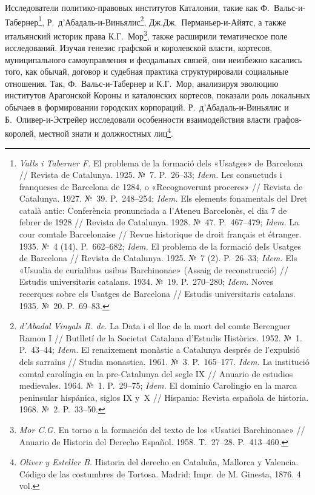 Исследователи политико-правовых институтов Каталонии, такие как Ф.~Вальс-и-Табернер\footnote{\emph{Valls i Taberner F.} El problema de la formació dels «Usatges» de Barcelona // Revista de Catalunya. 1925. №~7. P.~26--33; \emph{Idem.} Les consuetuds i franqueses de Barcelona de 1284, o «Recognoverunt proceres» // Revista de Catalunya. 1927. №~39. P.~248--254; \emph{Idem.} Els elements fonamentals del Dret català antic: Conferència pronunciada a l’Ateneu Barcelonès, el dia 7 de febrer de 1928 // Revista de Catalunya. 1928. №~47. P.~467--479; \emph{Idem.} La cour comtale Barcelonaise // Revue historique de droit français et étranger. 1935. №~4 (14). P.~662--682; \emph{Idem.} El problema de la formació deIs Usatges de Barcelona // Revista de Catalunya. 1925. №~7 (2). P.~26--33; \emph{Idem.} Els «Usualia de curialibus usibus Barchinonae» (Assaig de reconstrucció) // Estudis universitaris catalans. 1934. №~19. P.~270--280; \emph{Idem.} Noves recerques sobre els Usatges de Barcelona // Estudis universitaris catalans. 1935. №~20. P.~69--83.}, Р.~д’Абадаль-и-Виньялис\footnote{\emph{d’Abadal Vinyals R. de.} La Data i el lloc de la mort del comte Berenguer Ramon I // Butlletí de la Societat Catalana d’Estudis Històrics. 1952. №~1. P.~43--44; \emph{Idem.} El renaixement monàstic a Catalunya després de l’expulsió dels sarraïns // Studia monastica. 1961. №~3. P.~165--177. \emph{Idem.} La institució comtal carolíngia en la pre-Catalunya del segle IX // Anuario de estudios medievales. 1964. №~1. P.~29--75; \emph{Idem.} El dominio Carolingio en la marca peninsular hispánica, siglos IX y~X // Hispania: Revista española de historia. 1968. №~2. P.~33--50.}, Дж.Дж.~Перманьер-и-Айятс, а также итальянский историк права К.Г.~Мор\footnote{\emph{Mor C.G.} En torno a la formación del texto de los «Usatici Barchinonae» // Anuario de Historia del Derecho Español. 1958. T.~27--28. P.~413--460.}, также расширили тематическое поле исследований. Изучая генезис графской и королевской власти, кортесов, муниципального самоуправления и феодальных связей, они неизбежно касались того, как обычай, договор и судебная практика структурировали социальные отношения. Так, Ф.~Вальс-и-Табернер и К.Г.~Мор, анализируя эволюцию институтов Арагонской Короны и каталонских кортесов, показали роль локальных обычаев в формировании городских корпораций. Р.~д’Абадаль-и-Виньялис и Б.~Оливер-и-Эстрейер исследовали особенности взаимодействия власти графов-королей, местной знати и должностных лиц\footnote{\emph{Oliver y Esteller B.} Historia del derecho en Cataluña, Mallorca y Valencia. Código de las costumbres de Tortosa. Madrid: Impr. de M. Ginesta, 1876. 4 vol.}.

